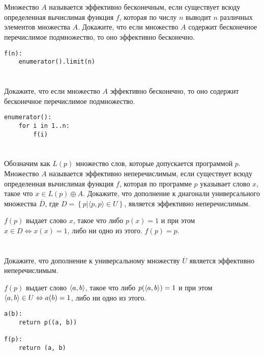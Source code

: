 \section{}
Множество $A$ называется эффективно бесконечным, если существует всюду определенная вычислимая функция $f$, которая по числу $n$ выводит $n$ различных элементов множества $A$. Докажите, что если множество $A$ содержит бесконечное перечислимое подмножество, то оно эффективно бесконечно.

\begin{verbatim}
f(n):
    enumerator().limit(n)
\end{verbatim}

\section{}
Докажите, что если множество $A$ эффективно бесконечно, то оно содержит бесконечное перечислимое подмножество.

\begin{verbatim}
enumerator():
    for i in 1..n:
        f(i)
\end{verbatim}

\section{}
Обозначим как $L(p)$ множество слов, которые допускается программой $p$. Множество $A$ называется эффективно неперечислимым, если существует всюду определенная вычислимая функция $f$, которая по программе $p$ указывает слово $x$, такое что $x \in L(p) \oplus A$. Докажите, что дополнение к диагонали универсального множества $\overline D$, где $D = \left\{p | \langle p, p\rangle \in U\right\}$, является эффективно неперечислимым.

\(f(p)\) выдает слово \(x\), такое что либо \(p(x) = 1\) и при этом \(x \in D \Leftrightarrow x(x) = 1\), либо ни одно из этого. \(f(p) = p\).

\section{}
Докажите, что дополнение к универсальному множеству $\overline U$ является эффективно неперечислимым.

\(f(p)\) выдает слово \(\langle a, b\rangle\), такое что либо \(p(\langle a, b\rangle) = 1\) и при этом \(\langle a, b\rangle \in U \Leftrightarrow a(b) = 1\), либо ни одно из этого.
\begin{verbatim}
a(b):
    return p((a, b))

f(p):
    return (a, b)
\end{verbatim}

